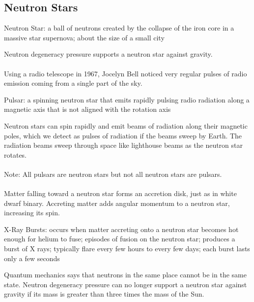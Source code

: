 \documentclass[12pt]{article}
\begin{document}
\subsection{Neutron Stars}
\begin{definition} Neutron Star: a ball of neutrons created by the collapse of the iron core in a massive star supernova; about the size of a small city \end{definition}
Neutron degeneracy pressure supports a neutron star against gravity. \\~\\
Using a radio telescope in 1967, Jocelyn Bell noticed very regular pulses of radio emission coming from a single part of the sky. 
\begin{definition} Pulsar: a spinning neutron star that emits rapidly pulsing radio radiation along a magnetic axis that is not aligned with the rotation axis \end{definition} 
Neutron stars can spin rapidly and emit beams of radiation along their magnetic poles, which we detect as pulses of radiation if the beams sweep by Earth. The radiation beams sweep through space like lighthouse beams as the neutron star rotates. \\~\\
Note: All pulsars are neutron stars but not all neutron stars are pulsars. \\~\\
Matter falling toward a neutron star forms an accretion disk, just as in white dwarf binary. Accreting matter adds angular momentum to a neutron star, increasing its spin. 
\begin{definition} X-Ray Bursts: occurs when matter accreting onto a neutron star becomes hot enough for helium to fuse; episodes of fusion on the neutron star; produces a burst of X rays; typically flare every few hours to every few days; each burst lasts only a few seconds \end{definition} 
Quantum mechanics says that neutrons in the same place cannot be in the same state. Neutron degeneracy pressure can no longer support a neutron star against gravity if its mass is greater than three times the mass of the Sun. 
\end{document}
